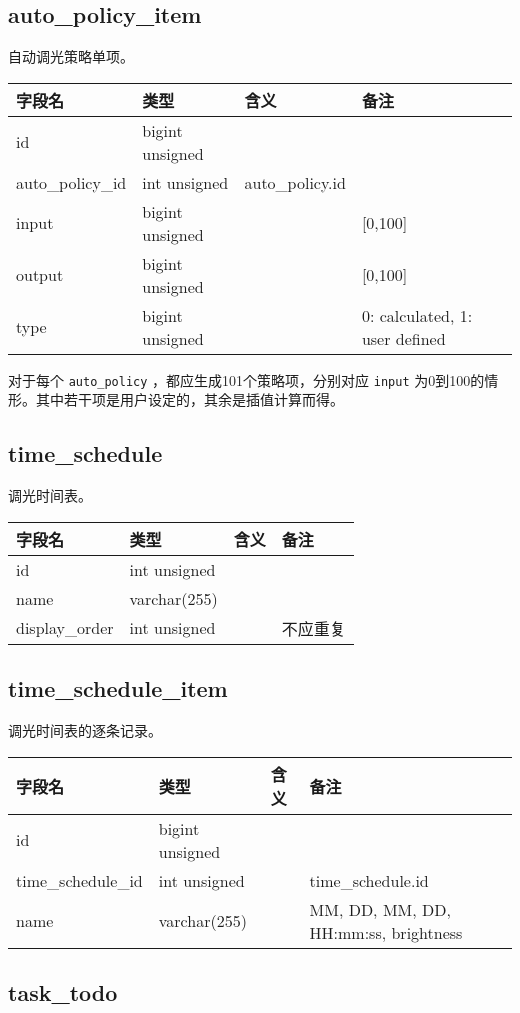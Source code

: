 \subsection{auto\_policy\_item}\label{autoux5fpolicyux5fitem}

自动调光策略单项。

\begin{longtabu}[c]{@{}lXXX@{}}
\toprule
字段名 & 类型 & 含义 & 备注\tabularnewline
\midrule
\endhead
id & bigint unsigned & &\tabularnewline
auto\_policy\_id & int unsigned & auto\_policy.id &\tabularnewline
input & bigint unsigned & & {[}0,100{]}\tabularnewline
output & bigint unsigned & & {[}0,100{]}\tabularnewline
type & bigint unsigned & & 0: calculated, 1: user defined\tabularnewline
\bottomrule
\end{longtabu}

对于每个 \texttt{auto\_policy} ，都应生成101个策略项，分别对应
\texttt{input}
为0到100的情形。其中若干项是用户设定的，其余是插值计算而得。

\subsection{time\_schedule}\label{timeux5fschedule}

调光时间表。

\begin{longtabu}[c]{@{}lXXX@{}}
\toprule
字段名 & 类型 & 含义 & 备注\tabularnewline
\midrule
\endhead
id & int unsigned & &\tabularnewline
name & varchar(255) & &\tabularnewline
display\_order & int unsigned & & 不应重复\tabularnewline
\bottomrule
\end{longtabu}

\subsection{time\_schedule\_item}\label{timeux5fscheduleux5fitem}

调光时间表的逐条记录。

\begin{longtabu}[c]{@{}lXXX@{}}
\toprule
字段名 & 类型 & 含义 & 备注\tabularnewline
\midrule
\endhead
id & bigint unsigned & &\tabularnewline
time\_schedule\_id & int unsigned & & time\_schedule.id\tabularnewline
name & varchar(255) & & MM, DD, MM, DD, HH:mm:ss,
brightness\tabularnewline
\bottomrule
\end{longtabu}

\subsection{task\_todo}\label{taskux5ftodo}

